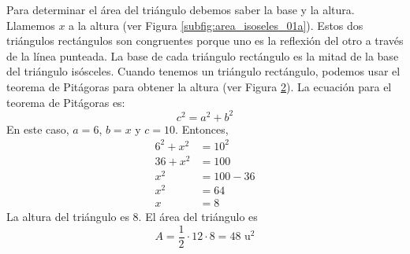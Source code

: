 \begin{solutionbox}{7.5cm}
\begin{figure}
\begin{subfigure}{\linewidth}
            \caption{}
            \label{subfig:area_isoseles_01b}
        \end{subfigure}
    \end{figure}
    Para determinar el área del triángulo debemos saber la base y la altura. Llamemos $x$ a la altura (ver Figura \ref{subfig:area_isoseles_01a}).
    Estos dos triángulos rectángulos son congruentes porque uno es la reflexión del otro a través de la línea punteada.
    La base de cada triángulo rectángulo es la mitad de la base del triángulo isósceles.
    Cuando tenemos un triángulo rectángulo, podemos usar el teorema de Pitágoras para obtener la altura (ver Figura \ref{subfig:area_isoseles_01b}).
    La ecuación para el teorema de Pitágoras es:
    \[c^2=a^2+b^2\]
    En este caso, $a=6$, $b=x$ y $c=10$. Entonces,
        \begin{align*}
        6^2+x^2 & =10^2   \\
        36+x^2  & =100    \\
        x^2     & =100-36 \\
        x^2     & =64     \\
        x       & =8
    \end{align*}
    La altura del triángulo es 8.
    El área del triángulo es
    \[A=\frac{1}{2}\cdot 12 \cdot 8 = 48 \text{ u}^2\]
\end{solutionbox}